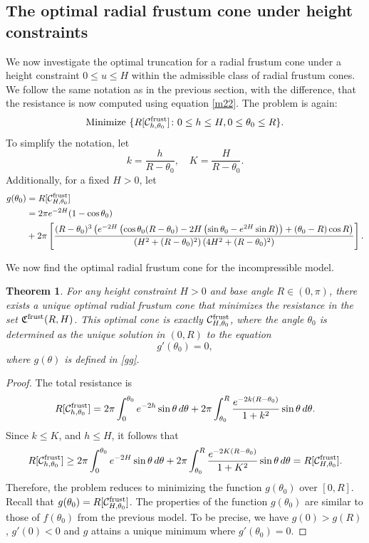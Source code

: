\documentclass[a4paper,12pt]{amsart}
\theoremstyle{plain}
\newtheorem{theorem}{Theorem}[section]
\theoremstyle{definition}
\begin{document}
\subsection{The optimal radial frustum cone under height constraints}
We now investigate     the optimal truncation for a radial frustum cone under a height constraint $0 \leq u \leq H$ within the admissible class of radial frustum cones. We follow the same notation as in the previous section, with the difference, that the resistance is now computed using  equation \eqref{m22}. The problem is again:
$$\textrm{Minimize }\{R[\mathcal{C}^{\rm frust}_{h,\theta_0}]\colon 0\leq h\leq H, 0\leq\theta_0\leq R\}.$$
To simplify the notation, let 
$$k=\frac{h}{R-\theta_0},\quad K=\frac{H}{R-\theta_0}.$$
Additionally, for a fixed $H>0$, let 
\begin{equation}\label{gg}
\begin{split}
g(\theta_0)&=R[\mathcal{C}^{\rm frust}_{H,\theta_0}]\\
&=2\pi e^{-2 H} (1-\cos \theta_0)\\
&+2 \pi \left[\frac{(R-\theta_0)^3 \left(e^{-2 H} \left(\cos \theta_0 (R-\theta_0)-2 H \left(\sin \theta_0-e^{2 H} \sin R\right)\right)+(\theta_0-R) \cos R\right)}{\left(H^2+(R-\theta_0)^2\right) \left(4 H^2+(R-\theta_0)^2\right)}\right].
\end{split}
\end{equation}

 
 We now find the optimal radial frustum cone for the incompressible model.

\begin{theorem}For any height constraint $H > 0$ and base angle $R \in (0, \pi)$, there exists a unique optimal radial frustum cone that minimizes the resistance in the set $\mathfrak{C}^{\rm frust}(R,H)$. This optimal cone is exactly $\mathcal{C}^{\rm frust}_{H,\theta_0}$, where the angle $\theta_0$ is determined as the unique solution in $(0, R)$ to the equation
\begin{equation}\label{g4}
g'(\theta_0)=0,
\end{equation}
where $g(\theta)$ is defined in \eqref{gg}. 
 \end{theorem}

\begin{proof}
The total resistance is 
$$
 R[\mathcal{C}^{\rm frust}_{h,\theta_0}] = 2\pi \int_0^{\theta_0} e^{-2h} \sin \theta \, d\theta + 2\pi \int_{\theta_0}^R \frac{e^{-2k (R-\theta_0)}}{1 + k ^2} \sin \theta \, d\theta.$$
Since $k\leq K$, and $h\leq H$, it follows that 
$$R[\mathcal{C}^{\rm frust}_{h,\theta_0}]\geq 2\pi \int_0^{\theta_0} e^{-2H} \sin \theta \, d\theta + 2\pi \int_{\theta_0}^R \frac{e^{-2K (R-\theta_0)}}{1 + K ^2} \sin \theta \, d\theta=R[\mathcal{C}^{\rm frust}_{H,\theta_0}].$$
Therefore, the problem reduces to minimizing the function $g(\theta_0)$ over $[0,R]$.  
Recall that $g(\theta_0)=R[\mathcal{C}^{\rm frust}_{H,\theta_0}]$. The properties of the function $g(\theta_0)$ are similar to those of $f(\theta_0)$ from the previous model. To be precise, we have $g(0)>g(R)$, $g'(0)<0$ and $g$ attains a unique minimum where $g'(\theta_0)=0$. 
\end{proof} 
\end{document}
